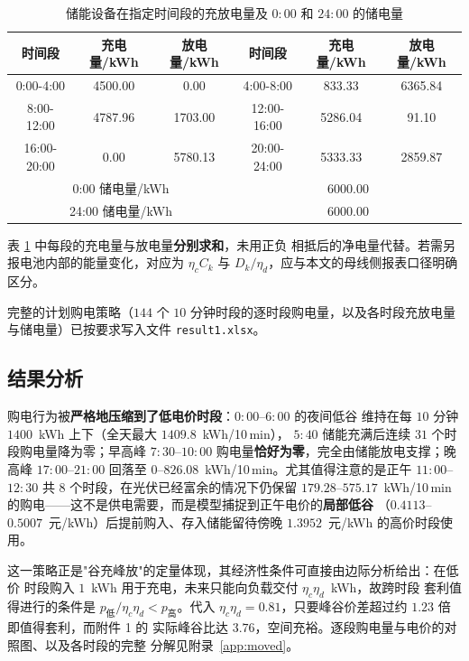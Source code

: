 \documentclass[withoutpreface,bwprint]{cumcmthesis}
\begin{document}
\begin{table}[htbp]
  \centering
  \caption{储能设备在指定时间段的充放电量及 $0{:}00$ 和 $24{:}00$ 的储电量}
  \label{tab:p1-storage}
  \begin{tabular}{cccccc}
    \toprule
    时间段 & 充电量/kWh & 放电量/kWh & 时间段 & 充电量/kWh & 放电量/kWh \\
    \midrule
    0:00-4:00   & 4500.00 & 0.00     & 4:00-8:00    & 833.33  & 6365.84 \\
    8:00-12:00  & 4787.96 & 1703.00  & 12:00-16:00  & 5286.04 & 91.10   \\
    16:00-20:00 & 0.00    & 5780.13  & 20:00-24:00  & 5333.33 & 2859.87 \\
    \midrule
    \multicolumn{3}{c}{0:00 储电量/kWh}  & \multicolumn{3}{c}{6000.00} \\
    \multicolumn{3}{c}{24:00 储电量/kWh} & \multicolumn{3}{c}{6000.00} \\
    \bottomrule
  \end{tabular}
\end{table}

表 \ref{tab:p1-storage} 中每段的充电量与放电量\textbf{分别求和}，未用正负
相抵后的净电量代替。若需另报电池内部的能量变化，对应为 $\eta_c C_k$ 与
$D_k/\eta_d$，应与本文的母线侧报表口径明确区分。

完整的计划购电策略（$144$ 个 $10$ 分钟时段的逐时段购电量，以及各时段充放电量
与储电量）已按要求写入文件 \texttt{result1.xlsx}。

\subsection{结果分析}

购电行为被\textbf{严格地压缩到了低电价时段}：$0{:}00$--$6{:}00$ 的夜间低谷
维持在每 $10$ 分钟 $1400$~kWh 上下（全天最大 $1409.8$~kWh/10\,min），
$5{:}40$ 储能充满后连续 $31$ 个时段购电量降为零；早高峰 $7{:}30$--$10{:}00$
购电量\textbf{恰好为零}，完全由储能放电支撑；晚高峰 $17{:}00$--$21{:}00$
回落至 $0$--$826.08$~kWh/10\,min。尤其值得注意的是正午 $11{:}00$--$12{:}30$
共 $8$ 个时段，在光伏已经富余的情况下仍保留 $179.28$--$575.17$~kWh/10\,min
的购电——这不是供电需要，而是模型捕捉到正午电价的\textbf{局部低谷}
（$0.4113$--$0.5007$~元/kWh）后提前购入、存入储能留待傍晚 $1.3952$~元/kWh
的高价时段使用。

这一策略正是"谷充峰放"的定量体现，其经济性条件可直接由边际分析给出：在低价
时段购入 $1$~kWh 用于充电，未来只能向负载交付 $\eta_c\eta_d$~kWh，故跨时段
套利值得进行的条件是 $p_{\text{低}}/\eta_c\eta_d < p_{\text{高}}$。代入
$\eta_c\eta_d=0.81$，只要峰谷价差超过约 $1.23$ 倍即值得套利，而附件 1 的
实际峰谷比达 $3.76$，空间充裕。逐段购电量与电价的对照图、以及各时段的完整
分解见附录~\ref{app:moved}。
\end{document}
